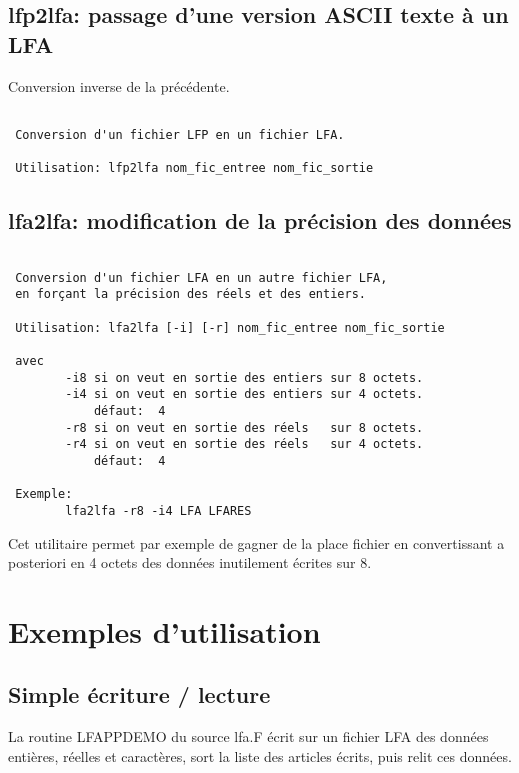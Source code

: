 \documentclass[10pt,french]{book}
\begin{document}
\section{lfp2lfa: passage d'une version ASCII texte à un LFA}

\p Conversion inverse de la précédente.

\begin{verbatim}
  
 Conversion d'un fichier LFP en un fichier LFA.
  
 Utilisation: lfp2lfa nom_fic_entree nom_fic_sortie

\end{verbatim}

\section{lfa2lfa: modification de la précision des données}

\begin{verbatim}
  
 Conversion d'un fichier LFA en un autre fichier LFA,
 en forçant la précision des réels et des entiers.
  
 Utilisation: lfa2lfa [-i] [-r] nom_fic_entree nom_fic_sortie
  
 avec
        -i8 si on veut en sortie des entiers sur 8 octets.
        -i4 si on veut en sortie des entiers sur 4 octets.
            défaut:  4
        -r8 si on veut en sortie des réels   sur 8 octets.
        -r4 si on veut en sortie des réels   sur 4 octets.
            défaut:  4
 
 Exemple:
        lfa2lfa -r8 -i4 LFA LFARES

\end{verbatim}

Cet utilitaire permet par exemple de gagner de la place
fichier en convertissant a posteriori en 4 octets des données inutilement
écrites sur 8.

\chapter{Exemples d'utilisation}
\section{Simple écriture / lecture}

\p La routine LFAPPDEMO du source lfa.F
écrit sur un fichier LFA des
données entières, réelles et caractères,
sort la liste des articles écrits, puis relit ces données.
\end{document}
